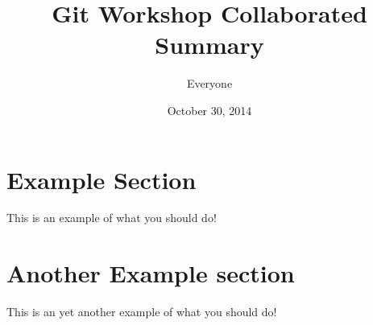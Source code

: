 \documentclass[11pt]{article}
\title{Git Workshop Collaborated Summary}
\author{Everyone}
\date{October 30, 2014}
\begin{document}
\maketitle
\tableofcontents
\pagebreak



\section{Example Section}

This is an example of what you should do!

\section{Another Example section}

This is an yet another example of what you should do!
\end{document}
